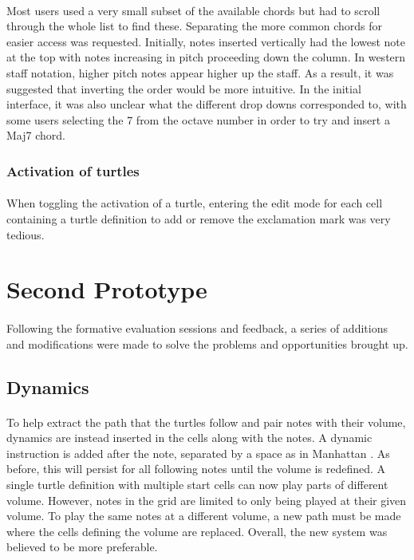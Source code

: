 \paragraph{} Most users used a very small subset of the available chords but had to scroll through the whole list to find these. Separating the more common chords for easier access was requested. Initially, notes inserted vertically  had the lowest note at the top with notes increasing in pitch proceeding down the column. In western staff notation, higher pitch notes appear higher up the staff. As a result, it was suggested that inverting the order would be more intuitive. In the initial interface, it was also unclear what the different drop downs corresponded to, with some users selecting the 7 from the octave number in order to try and insert a Maj7 chord.

\subsubsection{Activation of turtles}

\paragraph{} When toggling the activation of a turtle, entering the edit mode for each cell containing a turtle definition to add or remove the exclamation mark was very tedious.

\section{Second Prototype}

\paragraph{} Following the formative evaluation sessions and feedback, a series of additions and modifications were made to solve the problems and opportunities brought up.

\subsection{Dynamics}

\paragraph{} To help extract the path that the turtles follow and pair notes with their volume, dynamics are instead inserted in the cells along with the notes. A dynamic instruction is added after the note, separated by a space as in Manhattan \cite{nash:manhattan}. As before, this will persist for all following notes until the volume is redefined. A single turtle definition with multiple start cells can now play parts of different volume. However, notes in the grid are limited to only being played at their given volume. To play the same notes at a different volume, a new path must be made where the cells defining the volume are replaced. Overall, the new system was believed to be more preferable.


